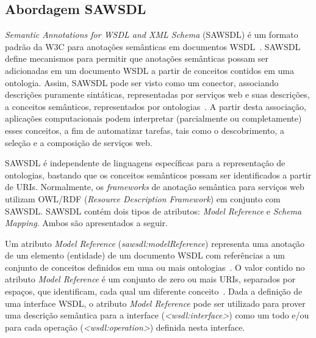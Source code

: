 \subsection{Abordagem SAWSDL}\label{2-fundamentacao-sws-sawsdl}

\textit{Semantic Annotations for WSDL and XML Schema} (SAWSDL) é um formato padrão da W3C para anotações semânticas em documentos WSDL~\cite{W3C-2007-SAWSDL}. SAWSDL define mecanismos para permitir que anotações semânticas possam ser adicionadas em um documento WSDL a partir de conceitos contidos em uma ontologia. Assim, SAWSDL pode ser visto como um conector, associando descrições puramente sintáticas, representadas por serviços web e suas descrições, a conceitos semânticos, representados por ontologias~\cite{KOPECKY-VITVAR-BOURNEZ-FARREL-2007-SAWSDL}. A partir desta associação, aplicações computacionais podem interpretar (parcialmente ou completamente) esses conceitos, a fim de automatizar tarefas, tais como o descobrimento, a seleção e a composição de serviços web.

SAWSDL é independente de linguagens específicas para a representação de ontologias, bastando que os conceitos semânticos possam ser identificados a partir de URIs. Normalmente, os \textit{frameworks} de anotação semântica para serviços web utilizam OWL/RDF (\textit{Resource Description Framework}) em conjunto com SAWSDL. SAWSDL contém dois tipos de atributos: \textit{Model Reference} e \textit{Schema Mapping}. Ambos são apresentados a seguir.

Um atributo \textit{Model Reference} (\textit{sawsdl:modelReference}) representa uma anotação de um elemento (entidade) de um documento WSDL com referências a um conjunto de conceitos definidos em uma ou mais ontologias~\cite{KOPECKY-VITVAR-BOURNEZ-FARREL-2007-SAWSDL}. O valor contido no atributo \textit{Model Reference} é um conjunto de zero ou mais URIs, separados por espaços, que identificam, cada qual um diferente conceito~\cite{W3C-2007-SAWSDL}. Dada a definição de uma interface WSDL, o atributo \textit{Model Reference} pode ser utilizado para prover uma descrição semântica para a interface (\textit{<wsdl:interface>}) como um todo e/ou para cada operação (\textit{<wsdl:operation>}) definida nesta interface.

